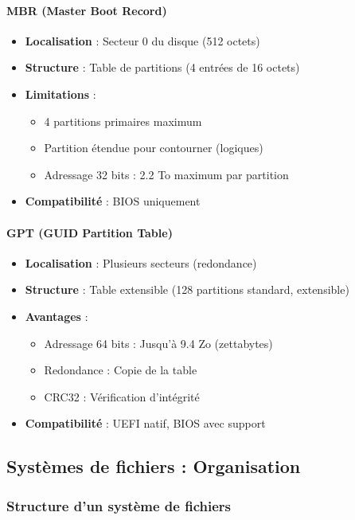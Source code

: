 \documentclass[12pt,a4paper]{article}
\begin{document}
\paragraph{MBR (Master Boot Record)}
\begin{itemize}
    \item \textbf{Localisation} : Secteur 0 du disque (512 octets)
    \item \textbf{Structure} : Table de partitions (4 entrées de 16 octets)
    \item \textbf{Limitations} :
    \begin{itemize}
        \item 4 partitions primaires maximum
        \item Partition étendue pour contourner (logiques)
        \item Adressage 32 bits : 2.2 To maximum par partition
    \end{itemize}
    \item \textbf{Compatibilité} : BIOS uniquement
\end{itemize}

\paragraph{GPT (GUID Partition Table)}
\begin{itemize}
    \item \textbf{Localisation} : Plusieurs secteurs (redondance)
    \item \textbf{Structure} : Table extensible (128 partitions standard, extensible)
    \item \textbf{Avantages} :
    \begin{itemize}
        \item Adressage 64 bits : Jusqu'à 9.4 Zo (zettabytes)
        \item Redondance : Copie de la table
        \item CRC32 : Vérification d'intégrité
    \end{itemize}
    \item \textbf{Compatibilité} : UEFI natif, BIOS avec support
\end{itemize}

\subsection{Systèmes de fichiers : Organisation}

\subsubsection{Structure d'un système de fichiers}
\end{document}
